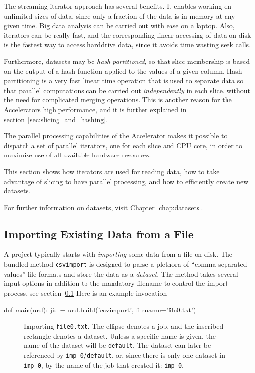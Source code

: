 The streaming iterator approach has several benefits.  It enables
working on unlimited sizes of data, since only a fraction of the data
is in memory at any given time.  Big data analysis can be carried out
with ease on a laptop.  Also, iterators can be really fast, and the
corresponding linear accessing of data on disk is the fastest way to
access harddrive data, since it avoids time wasting seek calls.





Furthermore, datasets may be \textsl{hash partitioned}, so that
slice-membership is based on the output of a hash function applied to
the values of a given column.  Hash partitioning is a very fast linear
time operation that is used to separate data so that parallel
computations can be carried out \emph{independently} in each slice,
without the need for complicated merging operations.  This is another
reason for the Accelerators high performance, and it is further
explained in section~\ref{sec:slicing_and_hashing}.

The parallel processing capabilities of the Accelerator makes
it possible to dispatch a set of parallel iterators, one for each
slice and CPU core, in order to maximise use of all available hardware
resources.

This section shows how iterators are used for reading data, how to
take advantage of slicing to have parallel processing, and how to
efficiently create new datasets.

For further information on datasets, visit Chapter \ref{chap:datasets}.



\subsection{Importing Existing Data from a File}

A project typically starts with \textsl{importing} some data from a
file on disk.  The bundled method \texttt{csvimport} is designed to
parse a plethora of ``comma separated values''-file formats and store
the data as a \emph{dataset}.
The method takes several input options in addition to the mandatory
filename to control the import process, see section~\ref{}  Here is an example
invocation
\begin{python}
def main(urd):
    jid = urd.build('csvimport', filename='file0.txt')
\end{python}

\begin{figure}[b]
  \begin{center}
    
    \caption{Importing \texttt{file0.txt}.  The ellipse denotes a job,
      and the inscribed rectangle denotes a dataset.  Unless a
      specific name is given, the name of the dataset will be
      \texttt{default}.  The dataset can later be referenced by
      \texttt{imp-0/default}, or, since there is only one dataset in
      \texttt{imp-0}, by the name of the job that created it:
      \texttt{imp-0}.}
    \label{fig:dataset_csvimport}
  \end{center}
\end{figure}

